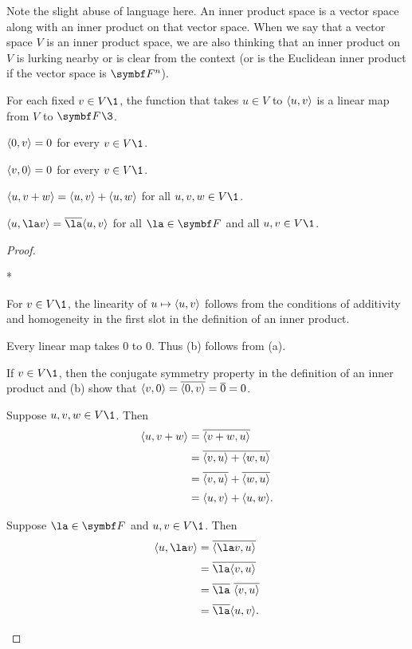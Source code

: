 Note the slight abuse of language here. An inner product space is a vector space along with an inner product on that vector space. When we say that a vector space $V$ is an inner product space, we are also thinking that an inner product on $V$ is lurking nearby or is clear from the context (or is the Euclidean inner product if the vector space is $\F{n}$).

{\begin{subtheorem}
\item
For each fixed $v \in V\1$, the function that takes $u \in V$ to $\langle u,v\rangle$ is a linear map from $V$ to $\F{}\3$.
\item
$\langle0, v\rangle = 0$ for every $v \in V\1$.
\item
$\langle v, 0\rangle = 0$ for every $v \in V\1$.
\item
$\langle u, v + w\rangle = \langle u , v\rangle + \langle u, w\rangle$ for all $u, v, w \in V\1$.
\item
$\ip{u, \la v} = \bar{\la} \ip{u,v}$ for all $\la \in \F{}$ and all $u, v \in V\1$.
\end{subtheorem}}

\begin{proof}
\begin{subtheorem}*
\item
For $v \in V\1$, the linearity of $u \mapsto \langle u,v\rangle$ follows from the conditions of additivity and homogeneity in the first slot in the definition of an inner product.

\item
Every linear map takes $0$ to $0$. Thus (b) follows from (a).

\item
If $v \in V\1$, then the conjugate symmetry property in the definition of an inner product and (b) show that $\langle v, 0\rangle = \overline{ \langle0, v\rangle } = \overline{0} = 0$.

\item
Suppose $u, v, w \in V\1$. Then
\begin{align*}
\langle u, v + w\rangle &= \overline{\langle v + w, u\rangle} \\[2bp]
&= \overline{\langle v , u\rangle + \langle w, u\rangle} \\[2bp]
&= \overline{\langle v , u\rangle} + \overline{\langle w, u\rangle} \\[2bp]
&= \langle u , v\rangle + \langle u, w\rangle.
\end{align*}

\item
Suppose $\la \in \F{}$ and $u,v \in V\1$. Then
\begin{align*}
\ip{u, \la v} &= \overline{\ip{\la v,u}} \\[2bp]
&= \overline{\la\ip{v,u}} \\[2bp]
&= \bar{\la} \, \, \overline{\ip{v,u}} \\[2bp]
&= \bar{\la} \ip{u,v}.
\end{align*}
\end{subtheorem}
\end{proof}

